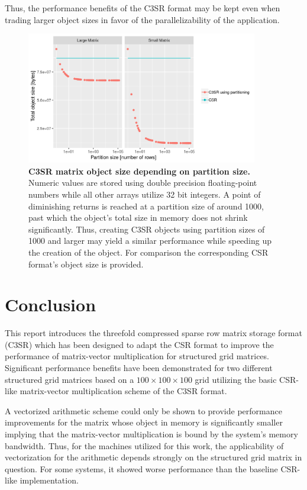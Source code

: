 \documentclass{article}
\begin{document}
    Thus, the performance benefits of the C3SR format may be kept even when trading larger object sizes in favor of the parallelizability of the application.

    \begin{figure}[ht]
      \centering
      \includegraphics[width=0.9\textwidth]{assets/structured_grid_matrix_heap_size}
      \caption[C3SR matrix object size depending on partition size]{\textbf{C3SR matrix object size depending on partition size.} Numeric values are stored using double precision floating-point numbers while all other arrays utilize 32 bit integers. A point of diminishing returns is reached at a partition size of around 1000, past which the object's total size in memory does not shrink significantly. Thus, creating C3SR objects using partition sizes of 1000 and larger may yield a similar performance while speeding up the creation of the object. For comparison the corresponding CSR format's object size is provided.}
      \label{fig:structured_grid_matrix_heap_size}
    \end{figure}

\section{Conclusion}

  This report introduces the threefold compressed sparse row matrix storage format (C3SR) which has been designed to adapt the CSR format to improve the performance of matrix-vector multiplication for structured grid matrices. Significant performance benefits have been demonstrated for two different structured grid matrices based on a $100 \times 100 \times 100$ grid utilizing the basic CSR-like matrix-vector multiplication scheme of the C3SR format.

  A vectorized arithmetic scheme could only be shown to provide performance improvements for the matrix whose object in memory is significantly smaller implying that the matrix-vector multiplication is bound by the system's memory bandwidth. Thus, for the machines utilized for this work, the applicability of vectorization for the arithmetic depends strongly on the structured grid matrix in question. For some systems, it showed worse performance than the baseline CSR-like implementation.
\end{document}
